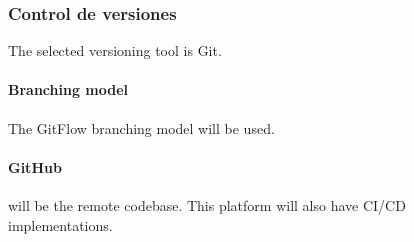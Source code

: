 \subsubsection{Control de versiones}

The selected versioning tool is Git.

\paragraph{Branching model} The GitFlow branching model will be used.

\paragraph{GitHub} will be the remote codebase. This platform will also have CI/CD implementations.
